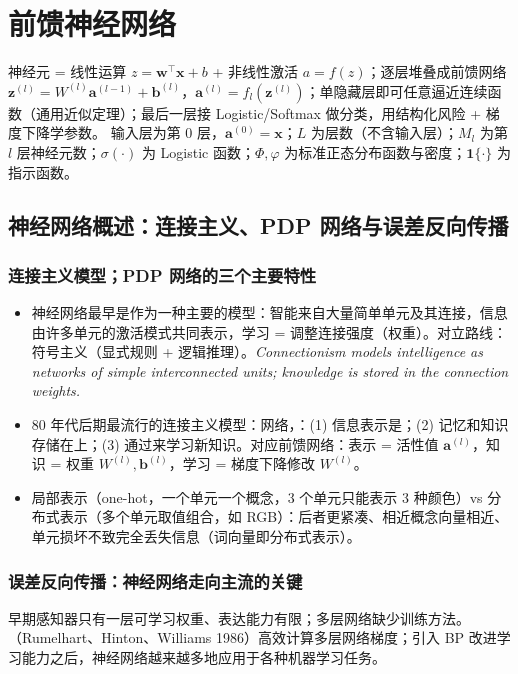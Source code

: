 \chapter{前馈神经网络}
\noindent{}\quad 神经元 = 线性运算 $z=\bm w^\top\bm x+b$ + 非线性激活 $a=f(z)$；逐层堆叠成前馈网络 $\bm z^{(l)}=W^{(l)}\bm a^{(l-1)}+\bm b^{(l)}$，$\bm a^{(l)}=f_l(\bm z^{(l)})$；单隐藏层即可任意逼近连续函数（通用近似定理）；最后一层接 Logistic/Softmax 做分类，用结构化风险 + 梯度下降学参数。
\quad 输入层为第 0 层，$\bm a^{(0)}=\bm x$；$L$ 为层数（不含输入层）；$M_l$ 为第 $l$ 层神经元数；$\sigma(\cdot)$ 为 Logistic 函数；$\Phi,\varphi$ 为标准正态分布函数与密度；$\mathbf 1\{\cdot\}$ 为指示函数。

\section{神经网络概述：连接主义、PDP 网络与误差反向传播}

\subsection{连接主义模型；PDP 网络的三个主要特性}
\begin{itemize}
\item 神经网络最早是作为一种主要的模型：智能来自大量简单单元及其连接，信息由许多单元的激活模式共同表示，学习 = 调整连接强度（权重）。对立路线：符号主义（显式规则 + 逻辑推理）。\textit{Connectionism models intelligence as networks of simple interconnected units; knowledge is stored in the connection weights.}
\item 80 年代后期最流行的连接主义模型：网络，：(1) 信息表示是；(2) 记忆和知识存储在上；(3) 通过来学习新知识。对应前馈网络：表示 = 活性值 $\bm a^{(l)}$，知识 = 权重 $W^{(l)},\bm b^{(l)}$，学习 = 梯度下降修改 $W^{(l)}$。
\item 局部表示（one-hot，一个单元一个概念，3 个单元只能表示 3 种颜色）vs 分布式表示（多个单元取值组合，如 RGB）：后者更紧凑、相近概念向量相近、单元损坏不致完全丢失信息（词向量即分布式表示）。
\end{itemize}

\subsection{误差反向传播：神经网络走向主流的关键}
早期感知器只有一层可学习权重、表达能力有限；多层网络缺少训练方法。（Rumelhart、Hinton、Williams 1986）高效计算多层网络梯度；引入 BP 改进学习能力之后，神经网络越来越多地应用于各种机器学习任务。

